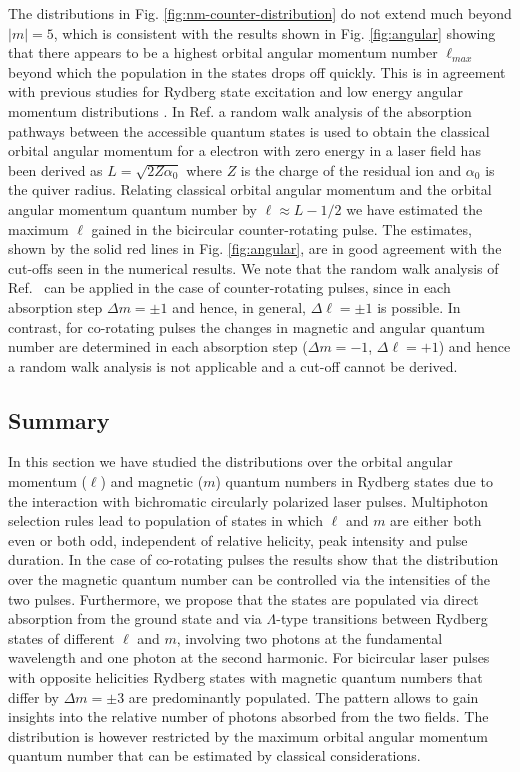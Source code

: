 The distributions in Fig. \ref{fig:nm-counter-distribution} do not extend much beyond $|m| = 5$, which is consistent with the results shown in Fig. \ref{fig:angular} showing that there appears to be a highest orbital angular momentum number $\ell_{max}$ beyond which the population in the states drops off quickly. This is in agreement with previous studies for Rydberg state excitation \cite{piraux2017,venzke2018_ryd} and low energy angular momentum distributions \cite{arbo2008}. In Ref. \cite{arbo2008} a random walk analysis of the absorption pathways between the accessible quantum states is used to obtain the classical orbital angular momentum for a electron with zero energy in a laser field has been derived as $L = \sqrt{2Z\alpha_0}$
where $Z$ is the charge of the residual ion and $\alpha_0$ is the quiver radius. Relating classical orbital angular momentum and the orbital angular momentum quantum number by $\ell \approx L - 1/2$ we have estimated the maximum $\ell$ gained in the bicircular counter-rotating pulse. The estimates, shown by the solid red lines in Fig. \ref{fig:angular}, are in good agreement with the cut-offs seen in the numerical results. We note that the random walk analysis of Ref.\ \cite{arbo2008} can be applied in the case of counter-rotating pulses, since in each absorption step $\Delta m = \pm 1$ and hence, in general, $\Delta \ell = \pm 1$ is possible. In contrast, for co-rotating pulses the changes in magnetic and angular quantum number are determined in each absorption step ($\Delta m = -1$, $\Delta \ell = +1$) and hence a random walk analysis is not applicable and a cut-off cannot be derived.

\subsection{Summary}
\label{sub:summary_bi_circ_ryd}

In this section we have studied the distributions over the orbital angular momentum ($\ell$) and magnetic ($m$) quantum numbers in Rydberg states due to the interaction with bichromatic circularly polarized laser pulses. Multiphoton selection rules lead to population of states in which $\ell$ and $m$ are either both even or both odd, independent of relative helicity, peak intensity and pulse duration. In the case of co-rotating pulses the results show that the distribution over the magnetic quantum number can be controlled via the intensities of the two pulses. Furthermore, we propose that the states are populated via direct absorption from the ground state and via $\Lambda$-type transitions between Rydberg states of different $\ell$ and $m$, involving two photons at the fundamental wavelength and one photon at the second harmonic. For bicircular laser pulses with opposite helicities Rydberg states with magnetic quantum numbers that differ by $\Delta m = \pm 3$ are predominantly populated. The pattern allows to gain insights into the relative number of photons absorbed from the two fields. The distribution is however restricted by the maximum orbital angular momentum quantum number that can be estimated by classical considerations.

